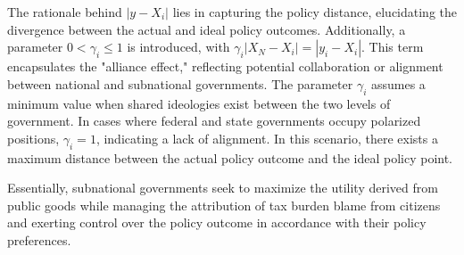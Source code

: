 The rationale behind $|y-X_i|$ \label{actposition}lies in capturing the policy distance, elucidating the divergence between the actual and ideal policy outcomes. Additionally, a parameter $0<\gamma_i\leq 1$ is introduced, with $\gamma_i|X_N-X_i|=|y_i-X_i|$. This term encapsulates the "alliance effect," reflecting potential collaboration or alignment between national and subnational governments. The parameter $\gamma_i$ assumes a minimum value when shared ideologies exist between the two levels of government. In cases where federal and state governments occupy polarized positions, $\gamma_i=1$, indicating a lack of alignment. In this scenario, there exists a maximum distance between the actual policy outcome and the ideal policy point.%



Essentially, subnational governments seek to maximize the utility derived from public goods while managing the attribution of tax burden blame from citizens and exerting control over the policy outcome in accordance with their policy preferences.

